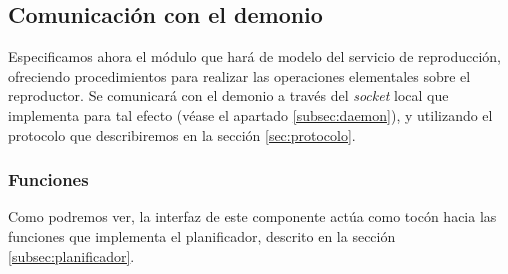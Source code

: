 \subsection{Comunicación con el demonio}

Especificamos ahora el módulo que hará de modelo del servicio de reproducción, ofreciendo procedimientos para realizar las operaciones elementales sobre el reproductor. Se comunicará con el demonio a través del \textit{socket} local que implementa para tal efecto (véase el apartado \ref{subsec:daemon}), y utilizando el protocolo que describiremos en la sección \ref{sec:protocolo}.

\subsubsection{Funciones}

Como podremos ver, la interfaz de este componente actúa como tocón hacia las funciones que implementa el planificador, descrito en la sección \ref{subsec:planificador}.

